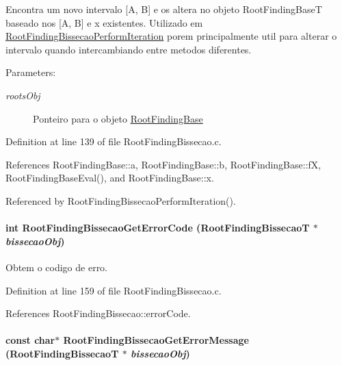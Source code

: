 Encontra um novo intervalo \mbox{[}A, B\mbox{]} e os altera no objeto RootFindingBaseT baseado nos \mbox{[}A, B\mbox{]} e x existentes. Utilizado em \hyperlink{group____bissecao_g00f707bfd08d203eb0b941b6b09e5639}{RootFindingBissecaoPerformIteration} porem principalmente util para alterar o intervalo quando intercambiando entre metodos diferentes. 

\begin{Desc}
\item[Parameters:]
\begin{description}
\item[{\em rootsObj}]Ponteiro para o objeto \hyperlink{structRootFindingBase}{RootFindingBase} \end{description}
\end{Desc}


Definition at line 139 of file RootFindingBissecao.c.

References RootFindingBase::a, RootFindingBase::b, RootFindingBase::fX, RootFindingBaseEval(), and RootFindingBase::x.

Referenced by RootFindingBissecaoPerformIteration().\hypertarget{group____bissecao_g9672d1ca4387db1792f8219968118900}{
\paragraph[RootFindingBissecaoGetErrorCode]{\setlength{\rightskip}{0pt plus 5cm}int RootFindingBissecaoGetErrorCode ({\bf RootFindingBissecaoT} $\ast$ {\em bissecaoObj})}\hfill}
\label{group____bissecao_g9672d1ca4387db1792f8219968118900}


Obtem o codigo de erro. 



Definition at line 159 of file RootFindingBissecao.c.

References RootFindingBissecao::errorCode.\hypertarget{group____bissecao_g77e94d3a9b5999461aabeca3bfe1837a}{
\paragraph[RootFindingBissecaoGetErrorMessage]{\setlength{\rightskip}{0pt plus 5cm}const char$\ast$ RootFindingBissecaoGetErrorMessage ({\bf RootFindingBissecaoT} $\ast$ {\em bissecaoObj})}\hfill}
\label{group____bissecao_g77e94d3a9b5999461aabeca3bfe1837a}


